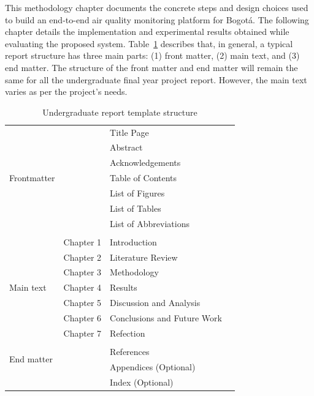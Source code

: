 This methodology chapter documents the concrete steps and design choices used to build an end-to-end air quality monitoring platform for Bogotá. The following chapter details the implementation and experimental results obtained while evaluating the proposed system. Table~\ref{tab:gen_template} describes that, in general, a typical report structure has three main parts: (1) front matter, (2) main text, and (3) end matter. %
The structure of the front matter and end matter will remain the same for all the undergraduate final year project report. However, the main text varies as per the project's needs.
\begin{table}[!ht]
    \centering
    \caption{Undergraduate report template structure}
    \label{tab:gen_template}
    \begin{tabular}{llll}     
        \toprule
        \multirow{7}{3cm}{Frontmatter} 
        & & Title Page & \\                  
        & & Abstract &    \\          
        & & Acknowledgements & \\                            
        & & Table of Contents &    \\                                
        & & List of Figures   &    \\                        
        & & List of Tables    &    \\                
        & & List of Abbreviations  &    \\                     
        & &   &    \\                        
        \multirow{7}{3cm}{Main text}
        & Chapter 1 & Introduction   &    \\                         
        & Chapter 2 & Literature Review   &    \\
        & Chapter 3 & Methodology   &    \\
        & Chapter 4 & Results    &    \\
        & Chapter 5 & Discussion and Analysis  &    \\
        & Chapter 6 & Conclusions and Future Work  &    \\        
        & Chapter 7 & Refection  &    \\          
        & &   &    \\                       
        \multirow{2}{3cm}{End matter}
        & & References  &    \\   
        & & Appendices (Optional)  &    \\ 
        & & Index (Optional)  &    \\ 
        \bottomrule
    \end{tabular}
\end{table}

